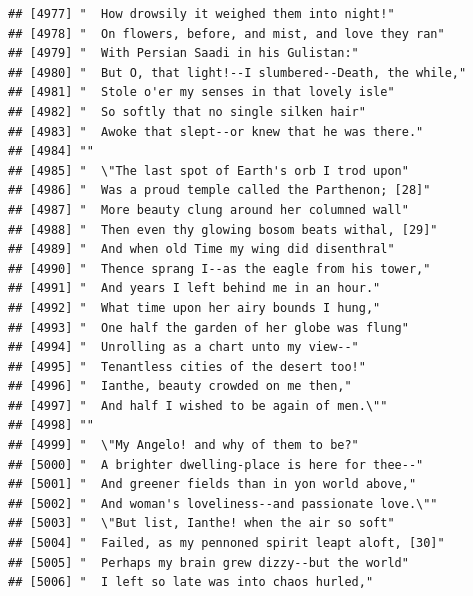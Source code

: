 \documentclass{article}\usepackage[]{graphicx}\usepackage[]{color}
\makeatletter
\newenvironment{kframe}{%
 \def\at@end@of@kframe{}%
 \ifinner\ifhmode%
  \def\at@end@of@kframe{\end{minipage}}%
  \begin{minipage}{\columnwidth}%
 \fi\fi%
 \def\FrameCommand##1{\hskip\@totalleftmargin \hskip-\fboxsep
 \colorbox{shadecolor}{##1}\hskip-\fboxsep
     \hskip-\linewidth \hskip-\@totalleftmargin \hskip\columnwidth}%
 \MakeFramed {\advance\hsize-\width
   \@totalleftmargin\z@ \linewidth\hsize
   \@setminipage}}%
 {\par\unskip\endMakeFramed%
 \at@end@of@kframe}
\newenvironment{knitrout}{}{} %
\makeatother
\begin{document}
\begin{knitrout}
\begin{kframe}
\begin{verbatim}
## [4977] "  How drowsily it weighed them into night!"                                  
## [4978] "  On flowers, before, and mist, and love they ran"                           
## [4979] "  With Persian Saadi in his Gulistan:"                                       
## [4980] "  But O, that light!--I slumbered--Death, the while,"                        
## [4981] "  Stole o'er my senses in that lovely isle"                                  
## [4982] "  So softly that no single silken hair"                                      
## [4983] "  Awoke that slept--or knew that he was there."                              
## [4984] ""                                                                            
## [4985] "  \"The last spot of Earth's orb I trod upon"                                
## [4986] "  Was a proud temple called the Parthenon; [28]"                             
## [4987] "  More beauty clung around her columned wall"                                
## [4988] "  Then even thy glowing bosom beats withal, [29]"                            
## [4989] "  And when old Time my wing did disenthral"                                  
## [4990] "  Thence sprang I--as the eagle from his tower,"                             
## [4991] "  And years I left behind me in an hour."                                    
## [4992] "  What time upon her airy bounds I hung,"                                    
## [4993] "  One half the garden of her globe was flung"                                
## [4994] "  Unrolling as a chart unto my view--"                                       
## [4995] "  Tenantless cities of the desert too!"                                      
## [4996] "  Ianthe, beauty crowded on me then,"                                        
## [4997] "  And half I wished to be again of men.\""                                   
## [4998] ""                                                                            
## [4999] "  \"My Angelo! and why of them to be?"                                       
## [5000] "  A brighter dwelling-place is here for thee--"                              
## [5001] "  And greener fields than in yon world above,"                               
## [5002] "  And woman's loveliness--and passionate love.\""                            
## [5003] "  \"But list, Ianthe! when the air so soft"                                  
## [5004] "  Failed, as my pennoned spirit leapt aloft, [30]"                           
## [5005] "  Perhaps my brain grew dizzy--but the world"                                
## [5006] "  I left so late was into chaos hurled,"                                     

\end{verbatim}
\end{kframe}
\end{knitrout}
\end{document}
